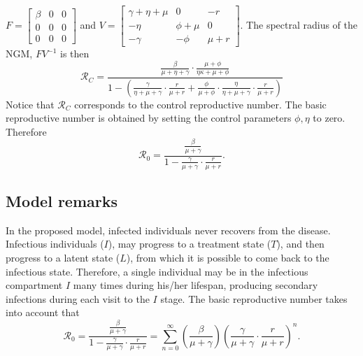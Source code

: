 \documentclass{book}
\begin{document}
\noindent $F=\left[\begin{array}{lll}\beta & 0 & 0 \\ 0 & 0 & 0 \\ 0 & 0 & 0\end{array}\right]$
and $V=\left[\begin{array}{ccc}\gamma+\eta+\mu & 0 & -r \\ -\eta & \phi+\mu & 0 \\ -\gamma & -\phi & \mu+r\end{array}\right]$.
%
The spectral radius of the NGM, $FV^{-1}$ is then
\begin{equation}
\mathcal{R}_C=\frac{\frac{\beta}{\mu+\eta+\gamma} \cdot \frac{\mu+\phi}{\eta \kappa+\mu+\phi}}{1-\left(\frac{\gamma}{\eta+\mu+\gamma} \cdot \frac{r}{\mu+r}+\frac{\phi}{\mu+\phi} \cdot \frac{\eta}{\eta+\mu+\gamma} \cdot \frac{r}{\mu+r}\right)}
\end{equation}
Notice that $\mathcal{R}_C$ corresponds to the control reproductive number. The basic reproductive number is obtained by setting the control parameters $\phi,\eta$ to zero. Therefore
\begin{equation} \label{eq:hsv2brn}
\mathcal{R}_0=\frac{\frac{\beta}{\mu+\gamma}}{1-\frac{\gamma}{\mu+\gamma} \cdot \frac{r}{\mu+r}}.
\end{equation}


\subsection*{Model remarks}
In the proposed model, infected individuals never recovers from the disease. Infectious individuals ($I$), may progress to a treatment state ($T$), and then progress to a latent state ($L$), from which it is possible to come back to the infectious state. Therefore, a single individual may be in the infectious compartment $I$ many times during his/her lifespan, producing secondary infections during each visit to the $I$ stage.
%
The basic reproductive number takes into account that 
\begin{equation} \label{eq:hsv2brnsrs}
\mathcal{R}_0=\frac{\frac{\beta}{\mu+\gamma}}{1-\frac{\gamma}{\mu+\gamma} \cdot \frac{r}{\mu+r}}=\sum_{n=0}^{\infty}\left(\frac{\beta}{\mu+\gamma}\right)\left(\frac{\gamma}{\mu+\gamma} \cdot \frac{r}{\mu+r}\right)^{n}.
\end{equation}
\end{document}
